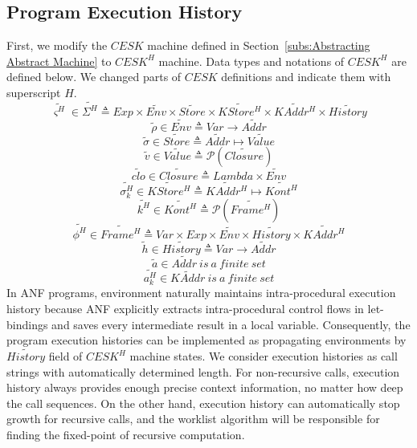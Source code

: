 \documentclass{article}
\begin{document}
\subsection{Program Execution History}
\label{sub:Program Execution History}
First, we modify the $CESK$ machine defined in Section~\ref{subs:Abstracting Abstract Machine} to $CESK^H$ machine.
Data types and notations of $CESK^H$ are defined below. We changed parts of $CESK$ definitions and indicate them with superscript $H$.
\[
\tag{states}
\widetilde{\varsigma^H}\in\widetilde{\Sigma^H} \triangleq Exp \times \widetilde{Env} \times \widetilde{Store}
\times \widetilde{KStore^H} \times \widetilde{KAddr^H} \times \widetilde{History}
\]
\[
\tag{environments}
\tilde{\rho} \in \widetilde{Env} \triangleq Var \to \widetilde{Addr}
\]
\[
\tag{stores}
\tilde{\sigma} \in \widetilde{Store} \triangleq \widetilde{Addr} \mapsto \widetilde{Value}
\]
\[
\tag{abstract values}
\tilde{v} \in \widetilde{Value} \triangleq \mathcal{P}(\widetilde{Closure})
\]
\[
\tag{closures}
\widetilde{clo} \in \widetilde{Closure} \triangleq Lambda \times \widetilde{Env}
\]
\[
\tag{continuation stores}
\widetilde{\sigma_k^H} \in \widetilde{KStore^H} \triangleq  \widetilde{KAddr^H} \mapsto  \widetilde{Kont^H}
\]
\[
\tag{abstract continuations}
\widetilde{k^H} \in  \widetilde{Kont^H} \triangleq  \mathcal{P}(\widetilde{Frame^H})
\]
\[
\tag{stack frames}
\widetilde{\phi^H} \in  \widetilde{Frame^H} \triangleq Var \times Exp \times  \widetilde{Env} \times \widetilde{History} \times  \widetilde{KAddr^H}
\]
\[
\tag{histories}
\tilde{h} \in \widetilde{History} \triangleq Var \to \widetilde{Addr}
\]
\[
\tag{value addresses}
\tilde{a} \in \widetilde{Addr} \ is\ a\ finite\ set
\]
\[
\tag{continuation addresses}
\widetilde{a_k^H} \in \widetilde{KAddr} \ is\ a\ finite\ set
\]
In ANF programs, environment naturally maintains intra-procedural execution history because ANF explicitly extracts intra-procedural control flows in let-bindings and saves every intermediate result in a local variable.
Consequently, the program execution histories can be implemented as propagating environments by $\widetilde{History}$ field of $CESK^H$ machine states.
We consider execution histories as call strings with automatically determined length. For non-recursive calls, execution history always provides enough precise context information, no matter how deep the call sequences. On the other hand, execution history can automatically stop growth for recursive calls, and the worklist algorithm will be responsible for finding the fixed-point of recursive computation.
\end{document}
